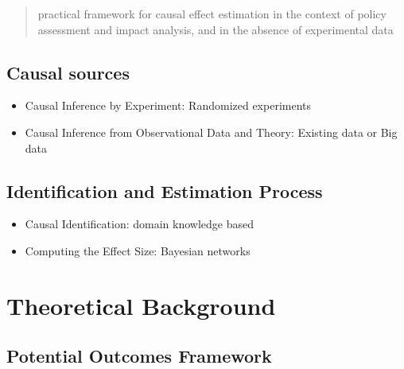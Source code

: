 \documentclass[
]{book}
\providecommand{\tightlist}{%
  \setlength{\itemsep}{0pt}\setlength{\parskip}{0pt}}
\begin{document}
\begin{quote}
practical framework for causal effect estimation in the context of policy assessment and impact analysis, and in the absence of experimental data
\end{quote}

\hypertarget{causal-sources}{%
\subsection{Causal sources}\label{causal-sources}}

\begin{itemize}
\tightlist
\item
  Causal Inference by Experiment: Randomized experiments
\item
  Causal Inference from Observational Data and Theory: Existing data or Big data
\end{itemize}

\hypertarget{identification-and-estimation-process}{%
\subsection{Identification and Estimation Process}\label{identification-and-estimation-process}}

\begin{itemize}
\tightlist
\item
  Causal Identification: domain knowledge based
\item
  Computing the Effect Size: Bayesian networks
\end{itemize}

\hypertarget{theoretical-background}{%
\section{Theoretical Background}\label{theoretical-background}}

\hypertarget{potential-outcomes-framework}{%
\subsection{Potential Outcomes Framework}\label{potential-outcomes-framework}}
\end{document}
